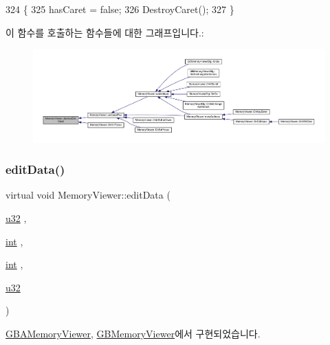 \begin{DoxyCode}
324 \{
325   hasCaret = \textcolor{keyword}{false};
326   DestroyCaret();
327 \}
\end{DoxyCode}
이 함수를 호출하는 함수들에 대한 그래프입니다.\+:
\nopagebreak
\begin{figure}[H]
\begin{center}
\leavevmode
\includegraphics[width=350pt]{class_memory_viewer_ab658d89232d31d190ac4e323d61c4b8f_icgraph}
\end{center}
\end{figure}
\mbox{\label{class_memory_viewer_a07778cf336e9f145a6403849407fb72d}} 
\subsubsection{\texorpdfstring{edit\+Data()}{editData()}}
{\footnotesize\ttfamily virtual void Memory\+Viewer\+::edit\+Data (\begin{DoxyParamCaption}\item[{\mbox{\hyperlink{_system_8h_a10e94b422ef0c20dcdec20d31a1f5049}{u32}}}]{,  }\item[{\mbox{\hyperlink{_util_8cpp_a0ef32aa8672df19503a49fab2d0c8071}{int}}}]{,  }\item[{\mbox{\hyperlink{_util_8cpp_a0ef32aa8672df19503a49fab2d0c8071}{int}}}]{,  }\item[{\mbox{\hyperlink{_system_8h_a10e94b422ef0c20dcdec20d31a1f5049}{u32}}}]{ }\end{DoxyParamCaption})\hspace{0.3cm}{\ttfamily [pure virtual]}}



\mbox{\hyperlink{class_g_b_a_memory_viewer_a6bfb5ccea3b6f87c3b186149538ad709}{G\+B\+A\+Memory\+Viewer}}, \mbox{\hyperlink{class_g_b_memory_viewer_ada4ac6d60aab7d4169b8809cf7fe7e1e}{G\+B\+Memory\+Viewer}}에서 구현되었습니다.


